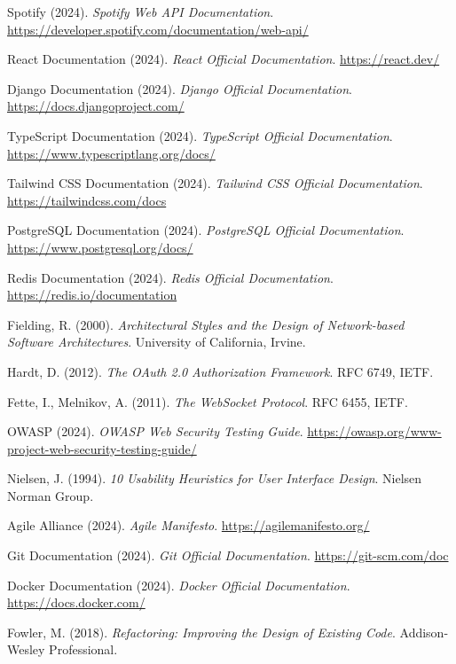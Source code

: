 \documentclass{book}
\begin{document}
\begin{thebibliography}{99}

 Spotify (2024). \textit{Spotify Web API Documentation}. 
\url{https://developer.spotify.com/documentation/web-api/}

 React Documentation (2024). \textit{React Official Documentation}.
\url{https://react.dev/}

 Django Documentation (2024). \textit{Django Official Documentation}.
\url{https://docs.djangoproject.com/}

 TypeScript Documentation (2024). \textit{TypeScript Official Documentation}.
\url{https://www.typescriptlang.org/docs/}

 Tailwind CSS Documentation (2024). \textit{Tailwind CSS Official Documentation}.
\url{https://tailwindcss.com/docs}

 PostgreSQL Documentation (2024). \textit{PostgreSQL Official Documentation}.
\url{https://www.postgresql.org/docs/}

 Redis Documentation (2024). \textit{Redis Official Documentation}.
\url{https://redis.io/documentation}

 Fielding, R. (2000). \textit{Architectural Styles and the Design of Network-based Software Architectures}. 
University of California, Irvine.

 Hardt, D. (2012). \textit{The OAuth 2.0 Authorization Framework}. 
RFC 6749, IETF.

 Fette, I., Melnikov, A. (2011). \textit{The WebSocket Protocol}. 
RFC 6455, IETF.

 OWASP (2024). \textit{OWASP Web Security Testing Guide}.
\url{https://owasp.org/www-project-web-security-testing-guide/}

 Nielsen, J. (1994). \textit{10 Usability Heuristics for User Interface Design}.
Nielsen Norman Group.

 Agile Alliance (2024). \textit{Agile Manifesto}.
\url{https://agilemanifesto.org/}

 Git Documentation (2024). \textit{Git Official Documentation}.
\url{https://git-scm.com/doc}

 Docker Documentation (2024). \textit{Docker Official Documentation}.
\url{https://docs.docker.com/}

 Fowler, M. (2018). \textit{Refactoring: Improving the Design of Existing Code}.
Addison-Wesley Professional.


\end{thebibliography}
\end{document}
